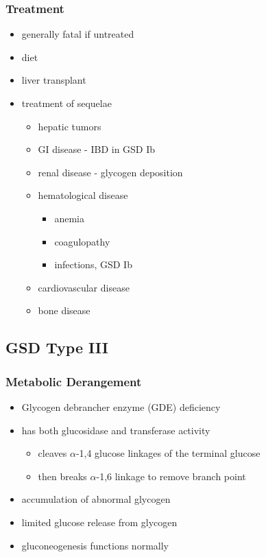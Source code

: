 \documentclass{scrartcl}
\begin{document}
\subsubsection{Treatment}
\label{sec:org7658d7f}
\begin{itemize}
\item generally fatal if untreated
\item diet
\item liver transplant
\item treatment of sequelae
\begin{itemize}
\item hepatic tumors
\item GI disease - IBD in GSD Ib
\item renal disease - glycogen deposition
\item hematological disease
\begin{itemize}
\item anemia
\item coagulopathy
\item infections, GSD Ib
\end{itemize}
\item cardiovascular disease
\item bone disease
\end{itemize}
\end{itemize}

\subsection{GSD Type III}
\label{sec:org6c56bba}
\subsubsection{Metabolic Derangement}
\label{sec:org699cc62}
\begin{itemize}
\item Glycogen debrancher enzyme (GDE) deficiency
\item has both glucosidase and transferase activity
\begin{itemize}
\item cleaves \(\alpha\)-1,4 glucose linkages of the terminal glucose
\item then breaks \(\alpha\)-1,6 linkage to remove branch point
\end{itemize}
\item accumulation of abnormal glycogen
\item limited glucose release from glycogen
\item gluconeogenesis functions normally
\end{itemize}
\end{document}
